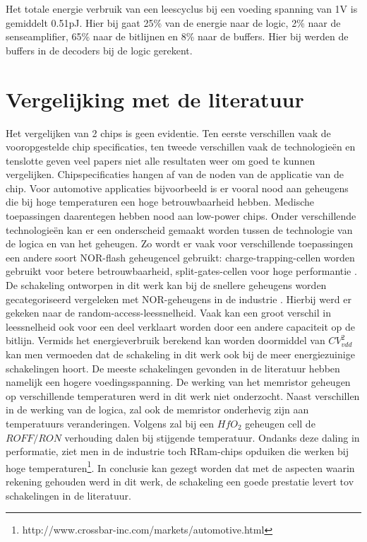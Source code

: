 Het totale energie verbruik van een leescyclus bij een voeding spanning van 1V is gemiddelt 0.51pJ. Hier bij gaat 25\% van de energie naar de logic, 2\% naar de senseamplifier, 65\% naar de bitlijnen en 8\% naar de buffers. Hier bij werden de buffers in de decoders bij de logic gerekent.

\section{Vergelijking met de literatuur}
Het vergelijken van 2 chips is geen evidentie. Ten eerste verschillen vaak de vooropgestelde chip specificaties, ten tweede verschillen vaak de technologieën en tenslotte geven veel papers niet alle resultaten weer om goed te kunnen vergelijken. Chipspecificaties hangen af van de noden van de applicatie van de chip. Voor automotive applicaties bijvoorbeeld is er vooral nood aan geheugens die bij hoge temperaturen een hoge betrouwbaarheid hebben. Medische toepassingen daarentegen hebben  nood aan low-power chips. Onder verschillende technologieën kan er een onderscheid gemaakt worden tussen de technologie van de logica en van het geheugen. Zo wordt er vaak voor verschillende toepassingen een andere soort NOR-flash geheugencel gebruikt: charge-trapping-cellen worden gebruikt voor betere betrouwbaarheid, split-gates-cellen voor hoge performantie \cite{5783209}. De schakeling ontworpen in dit werk kan bij de snellere geheugens worden gecategoriseerd vergeleken met NOR-geheugens in de industrie \cite{6649105}\cite{4433985}\cite{4027813}. Hierbij werd er gekeken naar de random-access-leessnelheid. Vaak kan een groot verschil in leessnelheid ook voor een deel verklaart worden door een andere capaciteit op de bitlijn. Vermids het energieverbruik berekend kan worden doormiddel van $CV_{vdd}^{2}$ kan men vermoeden dat de schakeling in dit werk ook bij de meer energiezuinige schakelingen hoort. De meeste schakelingen gevonden in de literatuur hebben namelijk een hogere voedingsspanning. De werking van het memristor geheugen op verschillende temperaturen werd in dit werk niet onderzocht. Naast verschillen in de werking van de logica, zal ook de memristor onderhevig zijn aan temperatuurs veranderingen. Volgens \cite{5948374} zal bij een $HfO_{2}$ geheugen cell de $ROFF/RON$ verhouding dalen bij stijgende temperatuur. Ondanks deze daling in performatie, ziet men in de industrie toch RRam-chips opduiken die werken bij hoge temperaturen\footnote{http://www.crossbar-inc.com/markets/automotive.html}. In conclusie kan gezegt worden dat met de aspecten waarin rekening gehouden werd in dit werk, de schakeling een goede prestatie levert tov schakelingen in de literatuur.

